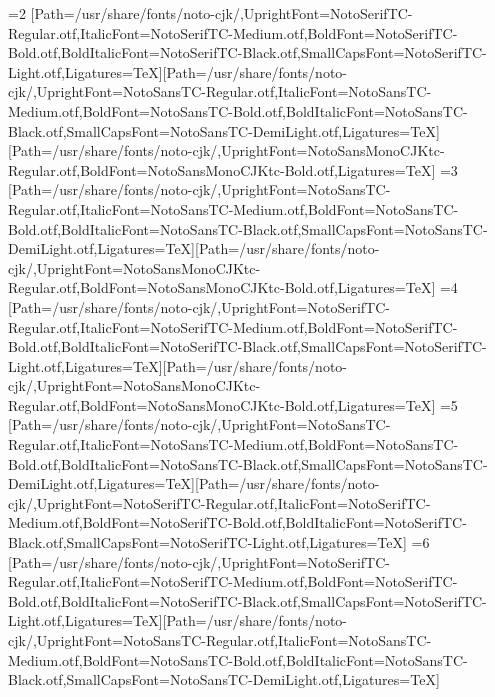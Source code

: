 \else\ifnum\value{CJKFonts}=2
[Path=/usr/share/fonts/noto-cjk/,UprightFont=NotoSerifTC-Regular.otf,ItalicFont=NotoSerifTC-Medium.otf,BoldFont=NotoSerifTC-Bold.otf,BoldItalicFont=NotoSerifTC-Black.otf,SmallCapsFont=NotoSerifTC-Light.otf,Ligatures=TeX][Path=/usr/share/fonts/noto-cjk/,UprightFont=NotoSansTC-Regular.otf,ItalicFont=NotoSansTC-Medium.otf,BoldFont=NotoSansTC-Bold.otf,BoldItalicFont=NotoSansTC-Black.otf,SmallCapsFont=NotoSansTC-DemiLight.otf,Ligatures=TeX][Path=/usr/share/fonts/noto-cjk/,UprightFont=NotoSansMonoCJKtc-Regular.otf,BoldFont=NotoSansMonoCJKtc-Bold.otf,Ligatures=TeX]
\else\ifnum\value{CJKFonts}=3
[Path=/usr/share/fonts/noto-cjk/,UprightFont=NotoSansTC-Regular.otf,ItalicFont=NotoSansTC-Medium.otf,BoldFont=NotoSansTC-Bold.otf,BoldItalicFont=NotoSansTC-Black.otf,SmallCapsFont=NotoSansTC-DemiLight.otf,Ligatures=TeX][Path=/usr/share/fonts/noto-cjk/,UprightFont=NotoSansMonoCJKtc-Regular.otf,BoldFont=NotoSansMonoCJKtc-Bold.otf,Ligatures=TeX]
\else\ifnum\value{CJKFonts}=4
[Path=/usr/share/fonts/noto-cjk/,UprightFont=NotoSerifTC-Regular.otf,ItalicFont=NotoSerifTC-Medium.otf,BoldFont=NotoSerifTC-Bold.otf,BoldItalicFont=NotoSerifTC-Black.otf,SmallCapsFont=NotoSerifTC-Light.otf,Ligatures=TeX][Path=/usr/share/fonts/noto-cjk/,UprightFont=NotoSansMonoCJKtc-Regular.otf,BoldFont=NotoSansMonoCJKtc-Bold.otf,Ligatures=TeX]
\else\ifnum\value{CJKFonts}=5
[Path=/usr/share/fonts/noto-cjk/,UprightFont=NotoSansTC-Regular.otf,ItalicFont=NotoSansTC-Medium.otf,BoldFont=NotoSansTC-Bold.otf,BoldItalicFont=NotoSansTC-Black.otf,SmallCapsFont=NotoSansTC-DemiLight.otf,Ligatures=TeX][Path=/usr/share/fonts/noto-cjk/,UprightFont=NotoSerifTC-Regular.otf,ItalicFont=NotoSerifTC-Medium.otf,BoldFont=NotoSerifTC-Bold.otf,BoldItalicFont=NotoSerifTC-Black.otf,SmallCapsFont=NotoSerifTC-Light.otf,Ligatures=TeX]
\else\ifnum\value{CJKFonts}=6
[Path=/usr/share/fonts/noto-cjk/,UprightFont=NotoSerifTC-Regular.otf,ItalicFont=NotoSerifTC-Medium.otf,BoldFont=NotoSerifTC-Bold.otf,BoldItalicFont=NotoSerifTC-Black.otf,SmallCapsFont=NotoSerifTC-Light.otf,Ligatures=TeX][Path=/usr/share/fonts/noto-cjk/,UprightFont=NotoSansTC-Regular.otf,ItalicFont=NotoSansTC-Medium.otf,BoldFont=NotoSansTC-Bold.otf,BoldItalicFont=NotoSansTC-Black.otf,SmallCapsFont=NotoSansTC-DemiLight.otf,Ligatures=TeX]
